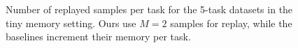 
\begin{figure}[t]
  \centering
  \setlength{\figwidth}{0.33\textwidth}
  \setlength{\figheight}{.14\textheight}
  \vspace{-2mm}
  
  \vspace{-4mm}
  \caption{
  Number of replayed samples per task for the 5-task datasets in the tiny memory setting. Ours use $M=2$ samples for replay, while the baselines increment their memory per task. %
  }
  \vspace{-4mm}
  \label{fig:tiny_memory_experiment_memory_usage}
\end{figure}